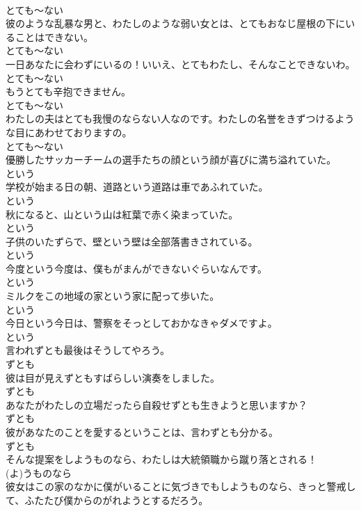 \documentclass[8pt]{extreport}
\begin{document}
\begin{CJK}{UTF8}{min}
\\	とても～ない
\\	彼のような乱暴な男と、わたしのような弱い女とは、とてもおなじ屋根の下にいることはできない。	
\\	とても～ない
\\	一日あなたに会わずにいるの！いいえ、とてもわたし、そんなことできないわ。	
\\	とても～ない
\\	もうとても辛抱できません。	
\\	とても～ない
\\	わたしの夫はとても我慢のならない人なのです。わたしの名誉をきずつけるような目にあわせておりますの。	
\\	とても～ない
\\	優勝したサッカーチームの選手たちの顔という顔が喜びに満ち溢れていた。	
\\	という
\\	学校が始まる日の朝、道路という道路は車であふれていた。	
\\	という
\\	秋になると、山という山は紅葉で赤く染まっていた。	
\\	という
\\	子供のいたずらで、壁という壁は全部落書きされている。	
\\	という
\\	今度という今度は、僕もがまんができないぐらいなんです。	
\\	という
\\	ミルクをこの地域の家という家に配って歩いた。	
\\	という
\\	今日という今日は、警察をそっとしておかなきゃダメですよ。	
\\	という
\\	言われずとも最後はそうしてやろう。	
\\	ずとも
\\	彼は目が見えずともすばらしい演奏をしました。	
\\	ずとも
\\	あなたがわたしの立場だったら自殺せずとも生きようと思いますか？	
\\	ずとも
\\	彼があなたのことを愛するということは、言わずとも分かる。	
\\	ずとも
\\	そんな提案をしようものなら、わたしは大統領職から蹴り落とされる！	
\\	(よ)うものなら
\\	彼女はこの家のなかに僕がいることに気づきでもしようものなら、きっと警戒して、ふたたび僕からのがれようとするだろう。	

\end{CJK}
\end{document}
